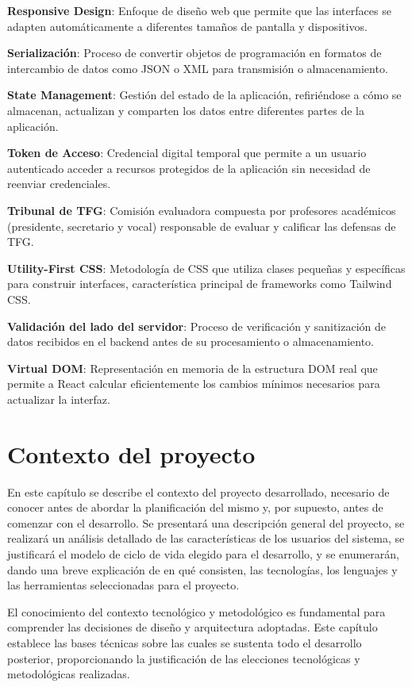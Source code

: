 \documentclass[12pt,a4paper,oneside]{report}
\begin{document}
\textbf{Responsive Design}: Enfoque de diseño web que permite que las
interfaces se adapten automáticamente a diferentes tamaños de pantalla y
dispositivos.

\textbf{Serialización}: Proceso de convertir objetos de programación en
formatos de intercambio de datos como JSON o XML para transmisión o
almacenamiento.

\textbf{State Management}: Gestión del estado de la aplicación,
refiriéndose a cómo se almacenan, actualizan y comparten los datos entre
diferentes partes de la aplicación.

\textbf{Token de Acceso}: Credencial digital temporal que permite a un
usuario autenticado acceder a recursos protegidos de la aplicación sin
necesidad de reenviar credenciales.

\textbf{Tribunal de TFG}: Comisión evaluadora compuesta por profesores
académicos (presidente, secretario y vocal) responsable de evaluar y
calificar las defensas de TFG.

\textbf{Utility-First CSS}: Metodología de CSS que utiliza clases
pequeñas y específicas para construir interfaces, característica
principal de frameworks como Tailwind CSS.

\textbf{Validación del lado del servidor}: Proceso de verificación y
sanitización de datos recibidos en el backend antes de su procesamiento
o almacenamiento.

\textbf{Virtual DOM}: Representación en memoria de la estructura DOM
real que permite a React calcular eficientemente los cambios mínimos
necesarios para actualizar la interfaz.

\chapter{Contexto del proyecto}\label{contexto-del-proyecto}
En este capítulo se describe el contexto del proyecto desarrollado,
necesario de conocer antes de abordar la planificación del mismo y, por
supuesto, antes de comenzar con el desarrollo. Se presentará una
descripción general del proyecto, se realizará un análisis detallado de
las características de los usuarios del sistema, se justificará el
modelo de ciclo de vida elegido para el desarrollo, y se enumerarán,
dando una breve explicación de en qué consisten, las tecnologías, los
lenguajes y las herramientas seleccionadas para el proyecto.

El conocimiento del contexto tecnológico y metodológico es fundamental
para comprender las decisiones de diseño y arquitectura adoptadas. Este
capítulo establece las bases técnicas sobre las cuales se sustenta todo
el desarrollo posterior, proporcionando la justificación de las
elecciones tecnológicas y metodológicas realizadas.
\end{document}
